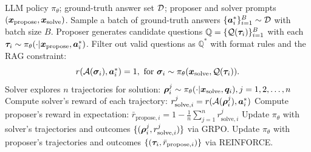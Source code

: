 
\begin{algorithm}[t]
\caption{Search Self-play training process.}
\label{alg:ssp_revised_v2}
\begin{algorithmic}[1]
\REQUIRE LLM policy $\pi_\theta$; ground-truth answer set ${\mathcal{D}}$; proposer and solver prompts $({\bm{x}}_\text{propose}, {\bm{x}}_\text{solve})$.
    \STATE Sample a batch of ground-truth answers $\{{\bm{a}}^*_i\}_{i=1}^B \sim {\mathcal{D}}$ with batch size $B$.
    \STATE Proposer generates candidate questions $\mathbb{Q} = \{ {\mathcal{Q}}({\bm{\tau}}_i) \}_{i=1}^B$ with each ${\bm{\tau}}_i \sim \pi_\theta(\cdot| {\bm{x}}_\text{propose}, {\bm{a}}^*_i)$.
    \STATE Filter out valid questions as $\mathbb{Q}^*$ with format rules and the RAG constraint: \begin{equation*}\textstyle
        r(\gA(\vsigma_i),\va^*_i)=1, \text{ for } \vsigma_i \sim \pi_\theta(\vx_\text{solve}, \gQ(\vtau_i)). 
        \vspace{-4mm}
    \end{equation*}
        \STATE Solver explores $n$ trajectories for solution: ${\bm{\rho}}^j_i \sim \pi_\theta(\cdot|{\bm{x}}_\text{solve}, {\bm{q}}_i), j=1,2,\dots,n$
        \STATE Compute solver's reward of each trajectory: $r_{\text{solve},i}^j = r({\mathcal{A}}({\bm{\rho}}_i^j), {\bm{a}}^*_i)$
        \STATE Compute proposer's reward in expectation: $\bar{r}_{\text{propose},i} = 1 - \frac{1}{n} \sum_{j=1}^n r_{\text{solve},i}^j$
    \ENDFOR 
    \STATE Update $\pi_\theta$ with solver's trajectories and outcomes $\{({\bm{\rho}}_i^j, r_{\text{solve},i}^j)\}$ via GRPO.
     \STATE Update $\pi_\theta$ with proposer's trajectories and outcomes $\{({\bm{\tau}}_i, \bar{r}_{\text{propose},i})\}$ via REINFORCE.
\ENDFOR
\end{algorithmic}
\end{algorithm}